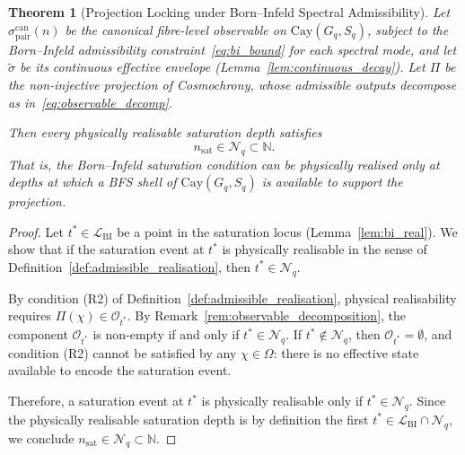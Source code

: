 \documentclass[12pt,a4paper]{article}
\newtheorem{theorem}{Theorem}[section]
\theoremstyle{remark}
\newcommand{\sigpair}{\sigma^{\mathrm{can}}_{\mathrm{pair}}}
\newcommand{\nsat}{n_{\mathrm{sat}}}
\newcommand{\Cay}{\mathrm{Cay}(G_q, S_q)}
\begin{document}
    \begin{theorem}[Projection Locking under Born--Infeld Spectral Admissibility]
      \label{thm:locking}
      Let $\sigpair(n)$ be the canonical fibre-level observable on $\Cay$,
      subject to the Born--Infeld admissibility constraint~\eqref{eq:bi_bound} for each spectral
      mode, and let $\tilde{\sigma}$ be its continuous effective envelope
      (Lemma~\ref{lem:continuous_decay}).
      Let $\Pi$ be the non-injective projection of Cosmochrony, whose admissible outputs decompose
      as in~\eqref{eq:observable_decomp}.

      Then every physically realisable saturation depth satisfies
      \begin{equation}
        \label{eq:locking}
        \nsat \in \mathcal{N}_q \subset \mathbb{N}.
      \end{equation}
      That is, the Born--Infeld saturation condition can be physically realised only at depths
      at which a BFS shell of $\Cay$ is available to support the projection.
    \end{theorem}

    \begin{proof}
      Let $t^* \in \mathcal{L}_{\mathrm{BI}}$ be a point in the saturation locus
      (Lemma~\ref{lem:bi_real}).
      We show that if the saturation event at $t^*$ is physically realisable in the sense of
      Definition~\ref{def:admissible_realisation}, then $t^* \in \mathcal{N}_q$.

      By condition (R2) of Definition~\ref{def:admissible_realisation}, physical realisability
      requires $\Pi(\chi) \in \mathcal{O}_{t^*}$.
      By Remark~\ref{rem:observable_decomposition}, the component $\mathcal{O}_{t^*}$ is
      non-empty if and only if $t^* \in \mathcal{N}_q$.
      If $t^* \notin \mathcal{N}_q$, then $\mathcal{O}_{t^*} = \emptyset$, and condition (R2)
      cannot be satisfied by any $\chi \in \Omega$: there is no effective state available to
      encode the saturation event.

      Therefore, a saturation event at $t^*$ is physically realisable only if
      $t^* \in \mathcal{N}_q$.
      Since the physically realisable saturation depth is by definition the first $t^* \in
      \mathcal{L}_{\mathrm{BI}} \cap \mathcal{N}_q$, we conclude $\nsat \in \mathcal{N}_q
      \subset \mathbb{N}$.
    \end{proof}
\end{document}
